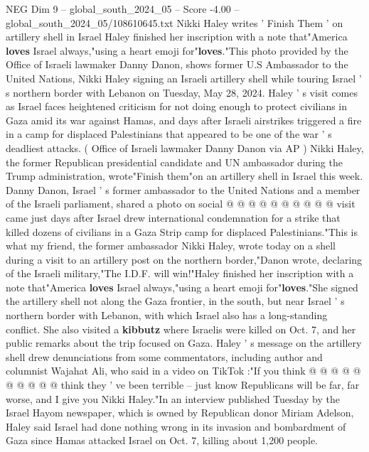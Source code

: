 \begin{textsample}{NEG Dim 9 – global\_south\_2024\_05 – Score -4.00 – global\_south\_2024\_05/108610645.txt}  \label{ex:f9_neg_406}
Nikki Haley writes ' Finish Them ' on artillery shell in Israel Haley finished her inscription with a note that"America \textbf{loves} Israel always,"using a heart emoji for"\textbf{loves}."This photo provided by the Office of Israeli lawmaker Danny Danon, shows former U.S Ambassador to the United Nations, Nikki Haley signing an Israeli artillery shell while touring Israel ' s northern border with Lebanon on Tuesday, May 28, 2024.
Haley ' s visit comes as Israel faces heightened criticism for not doing enough to protect civilians in Gaza amid its war against Hamas, and days after Israeli airstrikes triggered a fire in a camp for displaced Palestinians that appeared to be one of the war ' s deadliest attacks. ( Office of Israeli lawmaker Danny Danon via AP ) Nikki Haley, the former Republican presidential candidate and UN ambassador during the Trump administration, wrote"Finish them"on an artillery shell in Israel this week.
Danny Danon, Israel ' s former ambassador to the United Nations and a member of the Israeli parliament, shared a photo on social @ @ @ @ @ @ @ @ @ @ visit came just days after Israel drew international condemnation for a strike that killed dozens of civilians in a Gaza Strip camp for displaced Palestinians."This is what my friend, the former ambassador Nikki Haley, wrote today on a shell during a visit to an artillery post on the northern border,"Danon wrote, declaring of the Israeli military,"The I.D.F. will win!"Haley finished her inscription with a note that"America \textbf{loves} Israel always,"using a heart emoji for"\textbf{loves}."She signed the artillery shell not along the Gaza frontier, in the south, but near Israel ' s northern border with Lebanon, with which Israel also has a long-standing conflict.
She also visited a \textbf{kibbutz} where Israelis were killed on Oct. 7, and her public remarks about the trip focused on Gaza.
Haley ' s message on the artillery shell drew denunciations from some commentators, including author and columnist Wajahat Ali, who said in a video on TikTok :"If you think @ @ @ @ @ @ @ @ @ @ think they ' ve been terrible -- just know Republicans will be far, far worse, and I give you Nikki Haley."In an interview published Tuesday by the Israel Hayom newspaper, which is owned by Republican donor Miriam Adelson, Haley said Israel had done nothing wrong in its invasion and bombardment of Gaza since Hamas attacked Israel on Oct. 7, killing about 1,200 people.

\end{textsample}
